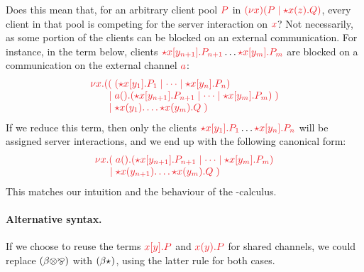 \documentclass[envcountsame,envcountsect,UKenglish]{llncs}
\begin{document}
Does this mean that, for an arbitrary client pool $\tm{P}$ in $\tm{\cpCut{x}{P}{\ncSrv{x}{z}{Q}}}$, every client in that pool is competing for the server interaction on $\tm{x}$? Not necessarily, as some portion of the clients can be blocked on an external communication. For instance, in the term below, clients $\tm{\ncCnt{x}{y_{n+1}}{P_{n+1}}} \dots \tm{\ncCnt{x}{y_m}{P_m}}$ are blocked on a communication on the external channel $\tm{a}$:
\[
  \arraycolsep=0pt
  \tm{
  \begin{array}{lrl}
    \nu x.&  ((&\; \ncPool{\ncCnt{x}{y_1}{P_1}}{\dots\mid\ncCnt{x}{y_n}{P_n}}\\
          &\mid&\; \cpWait{a}{\ncPool{\ncCnt{x}{y_{n+1}}{P_{n+1}}}{\dots \mid \ncCnt{x}{y_m}{P_m}}}\;)\\
          &\mid&\; \ncSrv{x}{y_1}{\dots\ncSrv{x}{y_m}{Q}}\;)
  \end{array}}
\]
If we reduce this term, then only the clients $\tm{\ncCnt{x}{y_1}{P_1}} \dots \tm{\ncCnt{x}{y_n}{P_n}}$ will be assigned server interactions, and we end up with the following canonical form:
\[
  \arraycolsep=0pt
  \tm{
  \begin{array}{lrl}
    \nu x.&   (&\; \cpWait{a}{\ncPool{\ncCnt{x}{y_{n+1}}{P_{n+1}}}{\dots\mid\ncCnt{x}{y_m}{P_m}}}\\
          &\mid&\; \ncSrv{x}{y_{n+1}}{\dots\ncSrv{x}{y_m}{Q}}\;)
  \end{array}}
\]
This matches our intuition and the behaviour of the \textpi-calculus.

\paragraph{Alternative syntax.}
If we choose to reuse the terms $\tm{\piSend{x}{y}{P}}$ and $\tm{\piRecv{x}{y}{P}}$ for shared channels, we could replace $(\beta{\ensuremath{\otimes}}{\mathbin{\bindnasrepma}})$ with $(\beta{\star}_{})$, using the latter rule for both cases.
\end{document}
